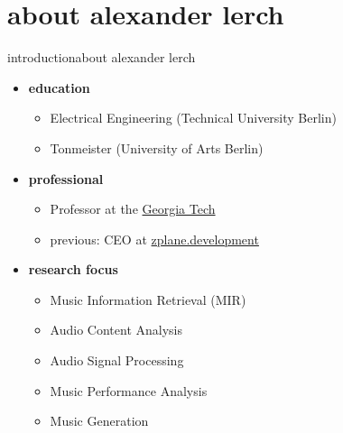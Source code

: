 

\subtitle{module 0.0: course introduction}


	

    \section[about]{about alexander lerch}
        \begin{frame}{introduction}{about alexander lerch}
            \begin{itemize}
                \item   \textbf{education}
                    \begin{itemize}
                        \item   Electrical Engineering (Technical University Berlin)
                        \item   Tonmeister (University of Arts Berlin)
                    \end{itemize}
        \smallskip
                \item   \textbf{professional}
                    \begin{itemize}
                        \item   Professor at the \href{https://music.gatech.edu}{Georgia Tech}
                        \item   previous: CEO at \href{https://www.zplane.de}{zplane.development}
                    \end{itemize}
        \smallskip
                \item   \textbf{research focus}
                    \begin{itemize}
                        \item   Music Information Retrieval (MIR)
                        \item   Audio Content Analysis
                        \item   Audio Signal Processing
                        \item   Music Performance Analysis
                        \item   Music Generation
                    \end{itemize}
            \end{itemize}
            
        \end{frame}

